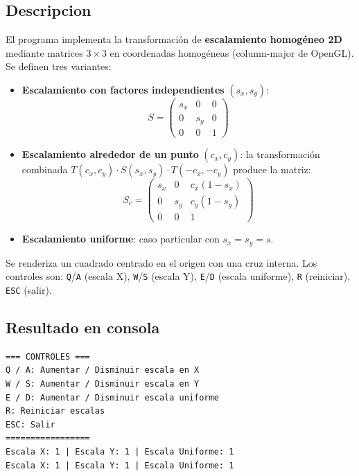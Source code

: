 \documentclass[12pt,a4paper]{article}
\begin{document}
\subsection{Descripcion}

El programa implementa la transformaci\'on de \textbf{escalamiento homog\'eneo 2D}
mediante matrices $3\times3$ en coordenadas homog\'eneas (column-major de OpenGL).
Se definen tres variantes:

\begin{itemize}
    \item \textbf{Escalamiento con factores independientes} $(s_x, s_y)$:
    \[
    S = \begin{pmatrix} s_x & 0 & 0 \\ 0 & s_y & 0 \\ 0 & 0 & 1 \end{pmatrix}
    \]

    \item \textbf{Escalamiento alrededor de un punto} $(c_x, c_y)$:
    la transformaci\'on combinada $T(c_x,c_y)\cdot S(s_x,s_y)\cdot T(-c_x,-c_y)$
    produce la matriz:
    \[
    S_c = \begin{pmatrix}
        s_x & 0   & c_x(1-s_x) \\
        0   & s_y & c_y(1-s_y) \\
        0   & 0   & 1
    \end{pmatrix}
    \]

    \item \textbf{Escalamiento uniforme}: caso particular con $s_x = s_y = s$.
\end{itemize}

Se renderiza un cuadrado centrado en el origen con una cruz interna.
Los controles son: \texttt{Q}/\texttt{A} (escala X), \texttt{W}/\texttt{S} (escala Y),
\texttt{E}/\texttt{D} (escala uniforme), \texttt{R} (reiniciar), \texttt{ESC} (salir).

\subsection{Resultado en consola}

\begin{verbatim}
=== CONTROLES ===
Q / A: Aumentar / Disminuir escala en X
W / S: Aumentar / Disminuir escala en Y
E / D: Aumentar / Disminuir escala uniforme
R: Reiniciar escalas
ESC: Salir
=================
Escala X: 1 | Escala Y: 1 | Escala Uniforme: 1
Escala X: 1 | Escala Y: 1 | Escala Uniforme: 1
\end{verbatim}
\end{document}

